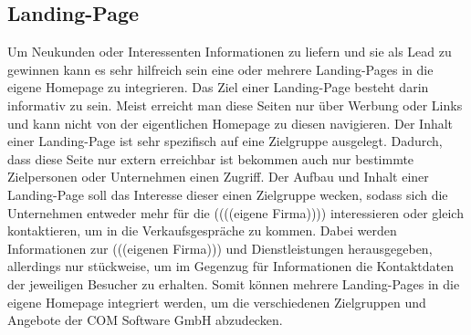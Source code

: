 \subsection{Landing-Page}
Um Neukunden oder Interessenten Informationen zu liefern und sie als Lead zu gewinnen kann es sehr hilfreich sein eine oder mehrere Landing-Pages in die eigene Homepage zu integrieren. Das Ziel einer Landing-Page besteht darin informativ zu sein. Meist erreicht man diese Seiten nur über Werbung oder Links und kann nicht von der eigentlichen Homepage zu diesen navigieren. 
\newline 
Der Inhalt einer Landing-Page ist sehr spezifisch auf eine Zielgruppe ausgelegt. Dadurch, dass diese Seite nur extern erreichbar ist bekommen auch nur bestimmte Zielpersonen oder Unternehmen einen Zugriff. Der Aufbau und Inhalt einer Landing-Page soll das Interesse dieser einen Zielgruppe wecken, sodass sich die Unternehmen entweder mehr für die ((((eigene Firma)))) interessieren oder gleich kontaktieren, um in die Verkaufsgespräche zu kommen. Dabei werden Informationen zur (((eigenen Firma))) und Dienstleistungen herausgegeben, allerdings nur stückweise, um im Gegenzug für Informationen die Kontaktdaten der jeweiligen Besucher zu erhalten.
\newline 
Somit können mehrere Landing-Pages in die eigene Homepage integriert werden, um die verschiedenen Zielgruppen und Angebote der COM Software GmbH abzudecken. 

